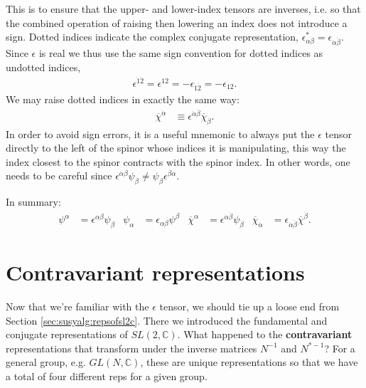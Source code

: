 \documentclass[12pt]{article}
\numberwithin{equation}{section}    %
\begin{document}
This is to ensure that the upper- and lower-index tensors are inverses, i.e. so that the combined operation of raising then lowering an index does not introduce a sign.
%
Dotted indices indicate the complex conjugate representation, $\epsilon_{\alpha\beta}^{*} = \epsilon_{\dot\alpha\dot\beta}$. Since $\epsilon$ is real we thus use the same sign convention for dotted indices as undotted indices,
\begin{align}
	\epsilon^{\dot 1 \dot 2} = \epsilon^{12} = - \epsilon_{\dot 1 \dot 2} = - \epsilon_{12}.
\end{align}
%
We may raise dotted indices in exactly the same way:
\begin{align}
	\overline\chi^{\dot\alpha} &\equiv \epsilon^{\dot \alpha \dot \beta}\overline\chi_{\dot\beta}.
\end{align}
In order to avoid sign errors, it is a useful mnemonic to always put the $\epsilon$ tensor directly to the left of the spinor whose indices it is manipulating, this way the index closest to the spinor contracts with the spinor index. In other words, one needs to be careful since  $\epsilon^{\alpha\beta}\psi_\beta \neq \psi_\beta\epsilon^{\beta\alpha}$.
%

In summary:
\begin{align}
	\psi^\alpha &= \epsilon^{\alpha\beta}\psi_\beta & \psi_\alpha &= \epsilon_{\alpha\beta}\psi^\beta & \overline\chi^\alpha &= \epsilon^{\dot\alpha\dot\beta}\psi_{\dot\beta} & \overline\chi_{\dot\alpha} &= \epsilon_{\dot\alpha\dot\beta}\overline\chi^{\dot\beta}.
\end{align}

\section{Contravariant representations}
Now that we're familiar with the $\epsilon$ tensor, we should tie up a loose end from Section \ref{sec:susyalg:repsofsl2c}. There we introduced the fundamental and conjugate representations of $SL(2,\mathbb{C})$. What happened to the \textbf{contravariant} representations that transform under the inverse matrices $N^{-1}$ and $N^{*-1}$? For a general group, e.g. $GL(N,\mathbb{C})$, these are unique representations so that we have a total of four different reps for a given group.
%
\end{document}

